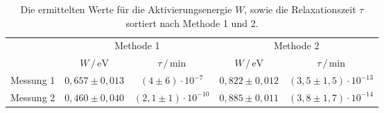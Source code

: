 \begin{table}[h]
    \centering
    \caption{Die ermittelten Werte für die Aktivierungsenergie $W$, sowie die Relaxationszeit $\tau$ sortiert nach Methode 1 und 2.}
    \label{tab:ergebnisse}
    \begin{tabular}{c c c c c}
      \toprule
      &\multicolumn{2}{c}{Methode 1} &\multicolumn{2}{c}{Methode 2}\\
      \cmidrule(lr){2-3}\cmidrule(lr){4-5}
                   &$W \, / \, \si{\electronvolt}$  &$\tau \, / \, \si{\minute}$ & $W \, / \, \si{\electronvolt}$    & $\tau \, / \, \si{\minute}$   \\
      \midrule
      Messung 1    & $0,657 \pm 0,013$              & $(4\pm 6)\cdot 10^{-7}$    & $0,822 \pm 0,012$                 & $(3,5\pm 1,5)\cdot 10^{-13}$  \\   
      Messung 2    & $0,460 \pm 0,040$              & $(2,1\pm 1)\cdot 10^{-10}$ & $0,885 \pm 0,011$                 & $(3,8\pm 1,7)\cdot 10^{-14}$  \\   
      \bottomrule
    \end{tabular}
  \end{table}

